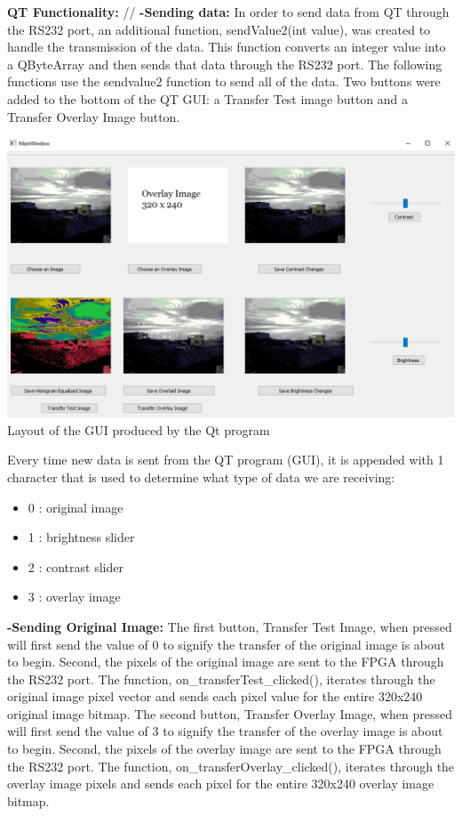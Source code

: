 \documentclass{article}
\newenvironment{Figure}
  {\par\medskip\noindent\ignorespaces\minipage{\linewidth}}
  {\endminipage\par\medskip}
\begin{document}
\begin{multicols*}{2}
{\bf QT Functionality:} //
{\bf-Sending data:}
In order to send data from QT through the RS232 port, an additional function, sendValue2(int value), was created to handle the transmission of the data. This function converts an integer value into a QByteArray and then sends that data through the RS232 port. The following functions use the sendvalue2 function to send all of the data.
Two buttons were added to the bottom of the QT GUI: a Transfer Test image button and a Transfer Overlay Image button.

\begin{Figure}
 \centering
 \includegraphics[width=\linewidth]{QT_GUI.jpg}
   {Layout of the GUI produced by the Qt program}
\end{Figure}

Every time new data is sent from the QT program (GUI), it is appended with 1 character that is used to determine what type of data we are receiving:

\begin{itemize}
  \item 0 : original image
  \item 1 : brightness slider
  \item 2 : contrast slider
  \item 3 : overlay image
\end{itemize}


{\bf-Sending Original Image:}
The first button, Transfer Test Image, when pressed will first send the value of 0 to signify the transfer of the original image is about to begin. Second, the pixels of the original image are sent to the FPGA through the RS232 port. The function, on\_transferTest\_clicked(), iterates through the original image pixel vector and sends each pixel value for the entire 320x240 original image bitmap.
The second button, Transfer Overlay Image, when pressed will first send the value of 3 to signify the transfer of the overlay image is about to begin. Second, the pixels of the overlay image are sent to the FPGA through the RS232 port. The function, on\_transferOverlay\_clicked(), iterates through the overlay image pixels and sends each pixel for the entire 320x240 overlay image bitmap.


\end{multicols*}
\end{document}
